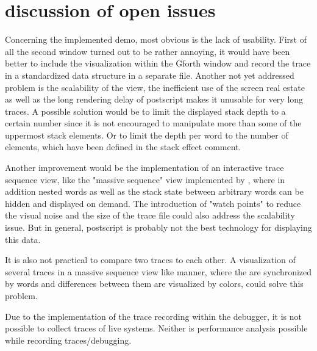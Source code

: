 \section{discussion of open issues}

Concerning the implemented demo, most obvious is the lack of usability. First of all the second window turned out to be rather annoying, it would have been better to include the visualization within the Gforth window and record the trace in a standardized data structure in a separate file.
Another not yet addressed problem is the scalability of the view, the inefficient use of the screen real estate as well as the long rendering delay of postscript makes it unusable for very long traces. A possible solution would be to limit the displayed stack depth to a certain number since it is not encouraged to manipulate more than some of the uppermost stack elements. Or to limit the depth per word to the number of elements, which have been defined in the stack effect comment.

Another improvement would be the implementation of an interactive trace sequence view, like the "massive sequence" view implemented by \cite{Cornelissen:2008:ETA:1454787.1454981}, where in addition nested words as well as the stack state between arbitrary words can be hidden and displayed on demand. The introduction of "watch points" to reduce the visual noise and the size of the trace file could also address the scalability issue. But in general, postscript is probably not the best technology for displaying this data.

It is also not practical to compare two traces to each other. A visualization of several traces in a massive sequence view like manner, where the are synchronized by words and differences between them are visualized by colors, could solve this problem.

Due to the implementation of the trace recording within the debugger, it is not possible to collect traces of live systems. Neither is performance analysis possible while recording traces/debugging.
 

